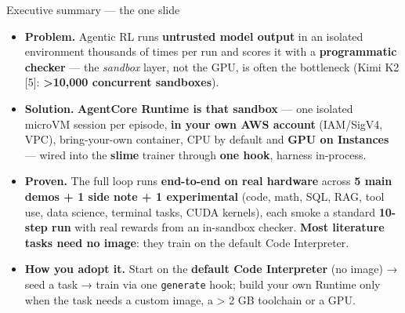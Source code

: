 \documentclass[
  10pt,
  ignorenonframetext,
  aspectratio=169,
  t]{beamer}
\providecommand{\tightlist}{%
  \setlength{\itemsep}{0pt}\setlength{\parskip}{0pt}}
\begin{document}
\begin{frame}{Executive summary --- the one slide}
\protect\hypertarget{executive-summary-the-one-slide}{}
\begin{itemize}
\tightlist
\item
  \textbf{Problem.} Agentic RL runs \textbf{untrusted model output} in
  an isolated environment thousands of times per run and scores it with
  a \textbf{programmatic checker} --- the \emph{sandbox} layer, not the
  GPU, is often the bottleneck (Kimi K2 {[}5{]}:
  \textbf{\textgreater10,000 concurrent sandboxes}).
\item
  \textbf{Solution.} \textbf{AgentCore Runtime is that sandbox} --- one
  isolated microVM session per episode, \textbf{in your own AWS account}
  (IAM/SigV4, VPC), bring-your-own container, CPU by default and
  \textbf{GPU on Instances} --- wired into the \textbf{slime} trainer
  through \textbf{one hook}, harness in-process.
\item
  \textbf{Proven.} The full loop runs \textbf{end-to-end on real
  hardware} across \textbf{5 main demos + 1 side note + 1 experimental}
  (code, math, SQL, RAG, tool use, data science, terminal tasks, CUDA
  kernels), each smoke a standard \textbf{10-step run} with real rewards
  from an in-sandbox checker. \textbf{Most literature tasks need no
  image}: they train on the default Code Interpreter.
\item
  \textbf{How you adopt it.} Start on the \textbf{default Code
  Interpreter} (no image) → seed a task → train via one
  \texttt{generate} hook; build your own Runtime only when the task
  needs a custom image, a \textgreater{} 2 GB toolchain or a GPU.
\end{itemize}
\end{frame}
\end{document}
